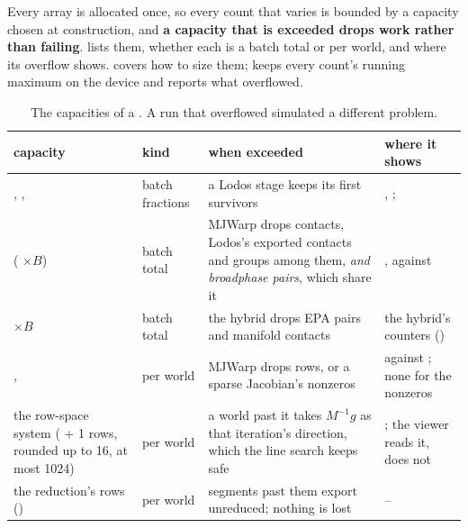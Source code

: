 Every array is allocated once, so every count that varies is bounded by a capacity chosen at construction, and \textbf{a capacity that is exceeded drops work rather than failing}.  lists them, whether each is a batch total or per world, and where its overflow shows.  covers how to size them;  keeps every count's running maximum on the device and reports what overflowed.

\begin{table}[t]
\centering
\caption{The capacities of a . A run that overflowed simulated a different problem.}
\label{tab:caps}
\small
\begin{tabularx}{\linewidth}{@{}L{30mm}L{17mm}YL{38mm}@{}}
\toprule
capacity & kind & when exceeded & where it shows \\
\midrule
{}, ,  & batch fractions & a Lodos stage keeps its first survivors & , ;  \\
 ( $\times B$) & batch total & MJWarp drops contacts, Lodos's exported contacts and groups among them, \emph{and broadphase pairs}, which share it & ,  against  \\
 $\times B$ & batch total & the hybrid drops EPA pairs and manifold contacts & the hybrid's counters () \\
,  & per world & MJWarp drops rows, or a sparse Jacobian's nonzeros &  against ; none for the nonzeros \\
the row-space system ( + 1 rows, rounded up to 16, at most 1024) & per world & a world past it takes $M^{-1} g$ as that iteration's direction, which the line search keeps safe & ; the viewer reads it,  does not \\
the reduction's rows () & per world & segments past them export unreduced; nothing is lost & -- \\
\bottomrule
\end{tabularx}
\end{table}

